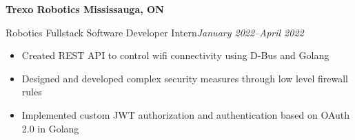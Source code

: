 \textbf{Trexo Robotics \hfill Mississauga, ON}

Robotics Fullstack Software Developer Intern\hfill \textit{January 2022--April 2022}
\begin{itemize}
    \item Created REST API to control wifi connectivity using D-Bus and Golang
    \item Designed and developed complex security measures through low level firewall rules
    \item Implemented custom JWT authorization and authentication based on OAuth 2.0 in Golang
\end{itemize}
